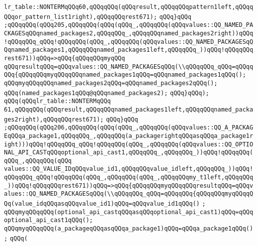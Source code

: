 \verb|lr_table::NONTERMqQQq60,qQQqqQQq(qQQqresult,qQQqqQQqpattern1left,qQQqqQQqor_pattern_list1right),qQQqqQQqrest671);|\newline
\verb|qQQq}qQQq|\newline
\verb|;qQQqqQQq(qQQq205,qQQqqQQq(qQQq(qQQq_,qQQqqQQq(qQQqvalues::QQ_NAMED_PACKAGESqQQqnamed_packages2,qQQqqQQq_,qQQqqQQqnamed_packages2right))qQQq!qQQqqQQq_qQQq!qQQqqQQq(qQQq_,qQQqqQQq(qQQqvalues::QQ_NAMED_PACKAGESqQQqnamed_packages1,qQQqqQQqnamed_packages1left,qQQqqQQq_))qQQq!qQQqqQQqrest671))qQQq=>qQQq{qQQqqQQqmyqQQq|\newline
\verb|qQQqresultqQQq=qQQqvalues::QQ_NAMED_PACKAGESqQQq(\\qQQqqQQq_qQQq=qQQqqQQq{qQQqqQQqmyqQQqqQQqnamed_packages1qQQq=qQQqnamed_packages1qQQq();|\newline
\verb|qQQqmyqQQqqQQqnamed_packages2qQQq=qQQqnamed_packages2qQQq();|\newline
\verb|qQQq(named_packages1qQQq@qQQqnamed_packages2);|\newline
\verb|qQQq}qQQq);|\newline
\verb|qQQq(qQQqlr_table::NONTERMqQQq|\newline
\verb|61,qQQqqQQq(qQQqresult,qQQqqQQqnamed_packages1left,qQQqqQQqnamed_packages2right),qQQqqQQqrest671);|\newline
\verb|qQQq}qQQq|\newline
\verb|;qQQqqQQq(qQQq206,qQQqqQQq(qQQq(qQQq_,qQQqqQQq(qQQqvalues::QQ_A_PACKAGEqQQqa_package1,qQQqqQQq_,qQQqqQQq(a_packagerightqQQqasqQQqa_package1right)))qQQq!qQQqqQQq_qQQq!qQQqqQQq(qQQq_,qQQqqQQq(qQQqvalues::QQ_OPTIONAL_API_CASTqQQqoptional_api_cast1,qQQqqQQq_,qQQqqQQq_))qQQq!qQQqqQQq(qQQq_,qQQqqQQq(qQQq|\newline
\verb|values::QQ_VALUE_IDqQQqvalue_id1,qQQqqQQqvalue_idleft,qQQqqQQq_))qQQq!qQQqqQQq_qQQq!qQQqqQQq(qQQq_,qQQqqQQq(qQQq_,qQQqqQQqmy_t1left,qQQqqQQq_))qQQq!qQQqqQQqrest671))qQQq=>qQQq{qQQqqQQqmyqQQqqQQqresultqQQq=qQQqvalues::QQ_NAMED_PACKAGESqQQq(\\qQQqqQQq_qQQq=qQQqqQQq{qQQqqQQqmyqQQqqQQq(value_idqQQqasqQQqvalue_id1)qQQq=qQQqvalue_id1qQQq()|\newline
\verb|;|\newline
\verb|qQQqmyqQQqqQQq(optional_api_castqQQqasqQQqoptional_api_cast1)qQQq=qQQqoptional_api_cast1qQQq();|\newline
\verb|qQQqmyqQQqqQQq(a_packageqQQqasqQQqa_package1)qQQq=qQQqa_package1qQQq();|\newline
\verb|qQQq(|\newline
